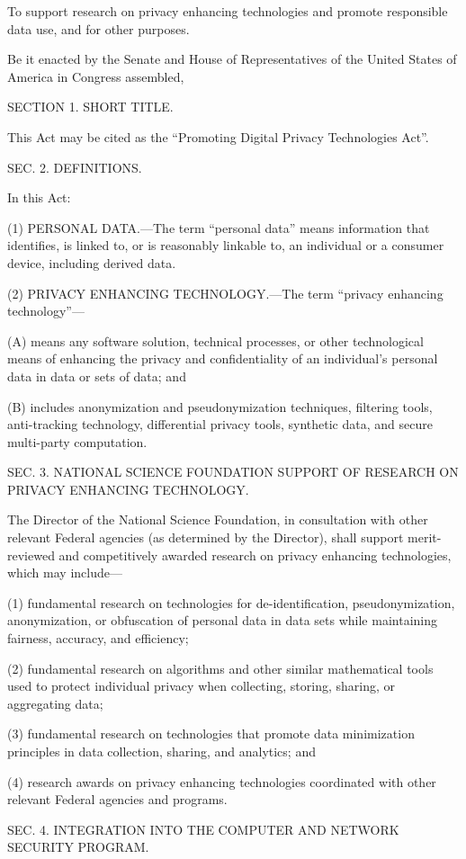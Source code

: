To support research on privacy enhancing technologies and promote responsible data use, and for other purposes.

Be it enacted by the Senate and House of Representatives of the United States of America in Congress assembled,

SECTION 1. SHORT TITLE.

This Act may be cited as the “Promoting Digital Privacy Technologies Act”.

SEC. 2. DEFINITIONS.

In this Act:

(1) PERSONAL DATA.—The term “personal data” means information that identifies, is linked to, or is reasonably linkable to, an individual or a consumer device, including derived data.

(2) PRIVACY ENHANCING TECHNOLOGY.—The term “privacy enhancing technology”—

(A) means any software solution, technical processes, or other technological means of enhancing the privacy and confidentiality of an individual’s personal data in data or sets of data; and

(B) includes anonymization and pseudonymization techniques, filtering tools, anti-tracking technology, differential privacy tools, synthetic data, and secure multi-party computation.

SEC. 3. NATIONAL SCIENCE FOUNDATION SUPPORT OF RESEARCH ON PRIVACY ENHANCING TECHNOLOGY.

The Director of the National Science Foundation, in consultation with other relevant Federal agencies (as determined by the Director), shall support merit-reviewed and competitively awarded research on privacy enhancing technologies, which may include—

(1) fundamental research on technologies for de-identification, pseudonymization, anonymization, or obfuscation of personal data in data sets while maintaining fairness, accuracy, and efficiency;

(2) fundamental research on algorithms and other similar mathematical tools used to protect individual privacy when collecting, storing, sharing, or aggregating data;

(3) fundamental research on technologies that promote data minimization principles in data collection, sharing, and analytics; and

(4) research awards on privacy enhancing technologies coordinated with other relevant Federal agencies and programs.

SEC. 4. INTEGRATION INTO THE COMPUTER AND NETWORK SECURITY PROGRAM.

